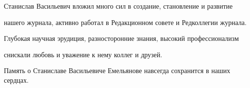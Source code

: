 Станислав Васильевич вложил много сил в создание, становление и развитие 


нашего журнала, активно работал в Редакционном совете и Редколлегии журнала. 


Глубокая научная эрудиция, разносторонние знания, высокий профессионализм 


снискали любовь и уважение к нему коллег и друзей.





\bigskip





Память о Станиславе Васильевиче Емельянове навсегда сохранится в наших сердцах.


